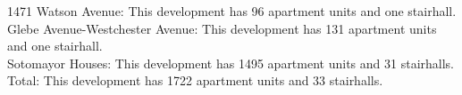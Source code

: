 {1471 Watson Avenue}: This development has 96 apartment units and one stairhall.\\{Glebe Avenue-Westchester Avenue}: This development has 131 apartment units and one stairhall.\\{Sotomayor Houses}: This development has 1495 apartment units and 31 stairhalls.\\{Total}: This development has 1722 apartment units and 33 stairhalls.\\